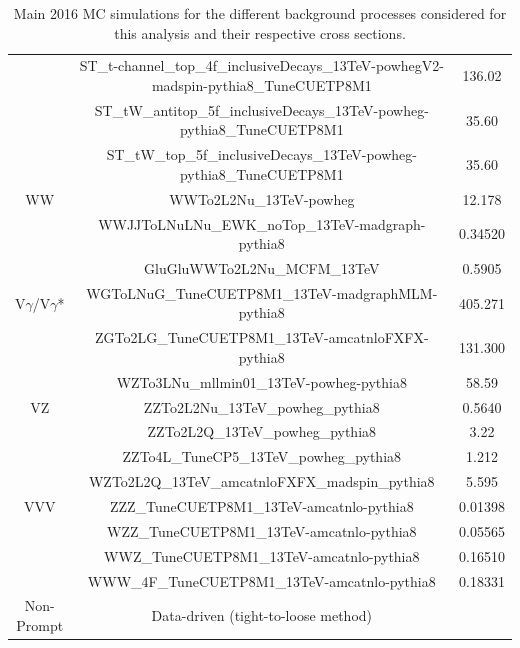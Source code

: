 \documentclass[a4paper, 10pt, openright]{report}
\begin{document}
\begin{appendices}
\begin{table}
\begin{center}
{\begin{tabular}{ c|c|c }
& ST\_t-channel\_top\_4f\_inclusiveDecays\_13TeV-powhegV2-madspin-pythia8\_TuneCUETP8M1 & 136.02 \\
& ST\_tW\_antitop\_5f\_inclusiveDecays\_13TeV-powheg-pythia8\_TuneCUETP8M1 & 35.60 \\
& ST\_tW\_top\_5f\_inclusiveDecays\_13TeV-powheg-pythia8\_TuneCUETP8M1 & 35.60 \\
\hline
WW & WWTo2L2Nu\_13TeV-powheg & 12.178 \\
& WWJJToLNuLNu\_EWK\_noTop\_13TeV-madgraph-pythia8 & 0.34520 \\
& GluGluWWTo2L2Nu\_MCFM\_13TeV & 0.5905 \\
\hline
V$\gamma$/V$\gamma$* & WGToLNuG\_TuneCUETP8M1\_13TeV-madgraphMLM-pythia8 & 405.271 \\ 
& ZGTo2LG\_TuneCUETP8M1\_13TeV-amcatnloFXFX-pythia8 & 131.300 \\
& WZTo3LNu\_mllmin01\_13TeV-powheg-pythia8 & 58.59 \\
\hline
VZ & ZZTo2L2Nu\_13TeV\_powheg\_pythia8 & 0.5640 \\
& ZZTo2L2Q\_13TeV\_powheg\_pythia8 & 3.22 \\
& ZZTo4L\_TuneCP5\_13TeV\_powheg\_pythia8 & 1.212 \\
& WZTo2L2Q\_13TeV\_amcatnloFXFX\_madspin\_pythia8 & 5.595 \\
 \hline
 VVV & ZZZ\_TuneCUETP8M1\_13TeV-amcatnlo-pythia8 & 0.01398 \\
 & WZZ\_TuneCUETP8M1\_13TeV-amcatnlo-pythia8 & 0.05565 \\
 & WWZ\_TuneCUETP8M1\_13TeV-amcatnlo-pythia8 & 0.16510 \\
 & WWW\_4F\_TuneCUETP8M1\_13TeV-amcatnlo-pythia8 & 0.18331 \\
 \hline
 Non-Prompt & Data-driven (tight-to-loose method) & \\
 \hline
\end{tabular}
}
\caption{Main 2016 \ac{MC} simulations for the different background processes considered for this analysis and their respective cross sections.}
\label{table:MC2016}
\end{center}
\end{table}


\end{appendices}
\end{document}
